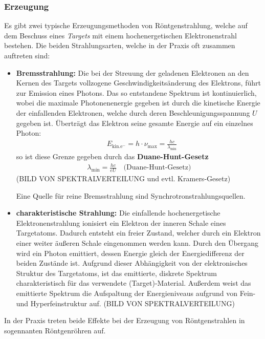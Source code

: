\documentclass[10pt, a4paper]{article}
\begin{document}
\subsubsection{Erzeugung}
Es gibt zwei typische Erzeugungsmethoden von Röntgenstrahlung, welche auf dem Beschuss eines \emph{Targets} mit einem hochenergetischen Elektronenstrahl bestehen.
Die beiden Strahlungsarten, welche in der Praxis oft zusammen auftreten sind:
\begin{itemize}
  \item \textbf{Bremsstrahlung:} Die bei der Streuung der geladenen Elektronen an den Kernen des Targets vollzogene Geschwindigkeitsänderung des Elektrons, führt zur Emission eines Photons.
  Das so entstandene Spektrum ist kontinuierlich, wobei die maximale Photonenenergie gegeben ist durch die kinetische Energie der einfallenden Elektronen, welche durch deren Beschleunigungsspannung $U$ gegeben ist.
  Überträgt das Elektron seine gesamte Energie auf ein einzelnes Photon:
  \begin{align}
    &E_\mathrm{kin. e^-} = h \cdot \nu_\mathrm{max} = \frac{hc}{\lambda_\mathrm{min}}
  \end{align}
  so ist diese Grenze gegeben durch das \textbf{Duane-Hunt-Gesetz}
  \begin{align}
    \lambda_\mathrm{min} = \frac{h c}{e U} \quad \text{(Duane-Hunt-Gesetz)}
  \end{align}
  (BILD VON SPEKTRALVERTEILUNG und evtl. Kramers-Gesetz)

  Eine Quelle für reine Bremsstrahlung sind Synchrotronstrahlungsquellen.

  \item \textbf{charakteristische Strahlung:} Die einfallende hochenergetische Elektronenstrahlung ionisiert ein Elektron der inneren Schale eines Targetatoms.
  Dadurch entsteht ein freier Zustand, welcher durch ein Elektron einer weiter äußeren Schale eingenommen werden kann.
  Durch den Übergang wird ein Photon emittiert, dessen Energie gleich der Energiedifferenz der beiden Zustände ist.
  Aufgrund dieser Abhängigkeit von der elektronisches Struktur des Targetatoms, ist das emittierte, diskrete Spektrum charakteristisch für das verwendete (Target)-Material.
  Außerdem weist das emittierte Spektrum die Aufspaltung der Energieniveaus aufgrund von Fein- und Hyperfeinstruktur auf.
  (BILD VON SPEKTRALVERTEILUNG)
\end{itemize}
In der Praxis treten beide Effekte bei der Erzeugung von Röntgenstrahlen in sogennanten Röntgenröhren auf.
\end{document}
